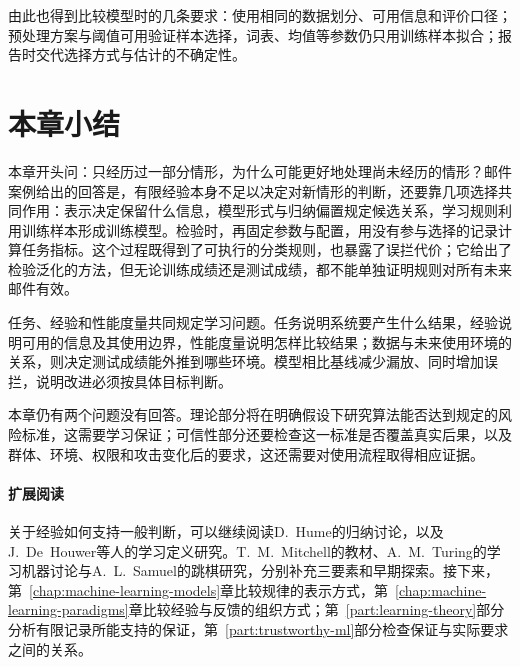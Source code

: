 由此也得到比较模型时的几条要求：使用相同的数据划分、可用信息和评价口径；预处理方案与阈值可用验证样本选择，词表、均值等参数仍只用训练样本拟合；报告时交代选择方式与估计的不确定性。

\section{本章小结}
\label{sec:introduction-summary}

本章开头问：只经历过一部分情形，为什么可能更好地处理尚未经历的情形？邮件案例给出的回答是，有限经验本身不足以决定对新情形的判断，还要靠几项选择共同作用：表示决定保留什么信息，模型形式与归纳偏置规定候选关系，学习规则利用训练样本形成训练模型。检验时，再固定参数与配置，用没有参与选择的记录计算任务指标。这个过程既得到了可执行的分类规则，也暴露了误拦代价；它给出了检验泛化的方法，但无论训练成绩还是测试成绩，都不能单独证明规则对所有未来邮件有效。

任务、经验和性能度量共同规定学习问题。任务说明系统要产生什么结果，经验说明可用的信息及其使用边界，性能度量说明怎样比较结果；数据与未来使用环境的关系，则决定测试成绩能外推到哪些环境。模型相比基线减少漏放、同时增加误拦，说明改进必须按具体目标判断。

本章仍有两个问题没有回答。理论部分将在明确假设下研究算法能否达到规定的风险标准，这需要学习保证；可信性部分还要检查这一标准是否覆盖真实后果，以及群体、环境、权限和攻击变化后的要求，这还需要对使用流程取得相应证据。

\paragraph{扩展阅读}

关于经验如何支持一般判断，可以继续阅读D.~Hume的归纳讨论，以及J.~De~Houwer等人的学习定义研究。T.~M.~Mitchell的教材、A.~M.~Turing的学习机器讨论与A.~L.~Samuel的跳棋研究，分别补充三要素和早期探索。接下来，第~\ref{chap:machine-learning-models}章比较规律的表示方式，第~\ref{chap:machine-learning-paradigms}章比较经验与反馈的组织方式；第~\ref{part:learning-theory}部分分析有限记录所能支持的保证，第~\ref{part:trustworthy-ml}部分检查保证与实际要求之间的关系。
